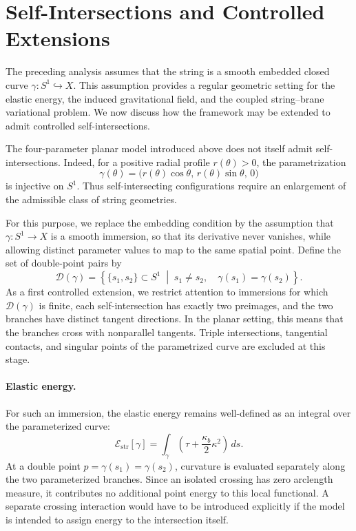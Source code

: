 \documentclass{article}
\numberwithin{tm}{section}
\numberwithin{dn}{section}
\numberwithin{as}{section}
\numberwithin{rk}{section}
\numberwithin{lem}{section}
\numberwithin{ax}{section}
\numberwithin{pp}{section}
\numberwithin{eg}{section}
\numberwithin{war}{section}
\numberwithin{equation}{section}
\numberwithin{prop}{section}
\numberwithin{nt}{section}
\numberwithin{rc}{section}
\begin{document}
\section{Self-Intersections and Controlled Extensions}
\label{sec:self-intersections}

The preceding analysis assumes that the string is a smooth embedded
closed curve \(\gamma:S^1\hookrightarrow X\). This assumption
provides a regular geometric setting for the elastic energy, the
induced gravitational field, and the coupled string--brane
variational problem. We now discuss how the framework may be
extended to admit controlled self-intersections.

The four-parameter planar model introduced above does not itself
admit self-intersections. Indeed, for a positive radial profile
\(r(\theta)>0\), the parametrization
\[
\gamma(\theta)
=
\bigl(r(\theta)\cos\theta,\,
r(\theta)\sin\theta,\,0\bigr)
\]
is injective on \(S^1\). Thus self-intersecting configurations
require an enlargement of the admissible class of string geometries.

For this purpose, we replace the embedding condition by the
assumption that \(\gamma:S^1\to X\) is a smooth immersion, so that
its derivative never vanishes, while allowing distinct parameter
values to map to the same spatial point. Define the set of
double-point pairs by
\[
\mathcal D(\gamma)
=
\left\{
\{s_1,s_2\}\subset S^1
\;\middle|\;
s_1\neq s_2,\quad
\gamma(s_1)=\gamma(s_2)
\right\}.
\]
As a first controlled extension, we restrict attention to immersions
for which \(\mathcal D(\gamma)\) is finite, each self-intersection
has exactly two preimages, and the two branches have distinct
tangent directions. In the planar setting, this means that the
branches cross with nonparallel tangents. Triple intersections,
tangential contacts, and singular points of the parametrized curve
are excluded at this stage.

\paragraph{Elastic energy.}
For such an immersion, the elastic energy remains well-defined
as an integral over the parameterized curve:
\[
\mathcal E_{\mathrm{str}}[\gamma]
=
\int_\gamma
\left(
\tau+\frac{\kappa_b}{2}\kappa^2
\right)\,ds.
\]
At a double point \(p=\gamma(s_1)=\gamma(s_2)\), curvature is
evaluated separately along the two parameterized branches. Since
an isolated crossing has zero arclength measure, it contributes
no additional point energy to this local functional. A separate
crossing interaction would have to be introduced explicitly if
the model is intended to assign energy to the intersection itself.
\end{document}
